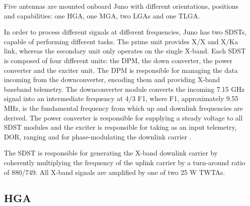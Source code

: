 Five antennas are mounted onboard Juno with different orientations, positions and capabilities: one HGA, one MGA, two LGAs and one TLGA. 

In order to process different signals at different frequencies, Juno has two SDSTs, capable of performing different tasks. The prime unit provides X/X and X/Ka link, whereas the secondary unit only operates on the single X-band. Each SDST is composed of four different units: the DPM, the down converter, the power converter and the exciter unit. 
The DPM is responsible for managing the data incoming from the downconverter, encoding them and providing X-band baseband telemetry. The downconverter module converts the incoming 7.15 GHz signal into an intermediate frequency at 4/3 F1, where F1, approximately 9.55 MHz, is the fundamental frequency from which up and downlink frequencies are derived. The power converter is responsible for supplying a steady voltage to all SDST modules and the exciter is responsible for taking as an input telemetry, DOR, ranging and for phase-modulating the downlink carrier \cite{juno_telecommunication}\cite{ka_uplink}. 

The SDST is responsible for generating the X-band downlink carrier by coherently multiplying the frequency of the uplink carrier by a turn-around ratio of 880/749. All X-band signals are amplified by one of two 25 W TWTAs\cite{juno_telecommunication}.  


\subsection{HGA}
\label{subsec:hga}


